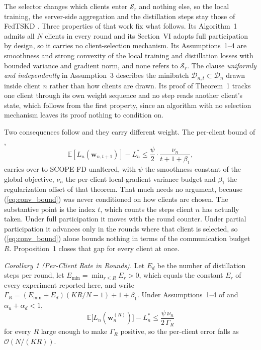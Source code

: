 \documentclass[journal]{IEEEtran}
\newcommand{\rev}[1]{#1}
\begin{document}
\rev{The selector changes which clients enter $\mathcal{S}_r$ and nothing else, so the local training, the server-side aggregation and the distillation steps stay those of FedTSKD \cite{mu2024fedtskd}. Three properties of that work fix what follows. Its Algorithm~1 admits all $N$ clients in every round and its Section~VI adopts full participation by design, so it carries no client-selection mechanism. Its Assumptions~1--4 are smoothness and strong convexity of the local training and distillation losses with bounded variance and gradient norm, and none refers to $\mathcal{S}_r$. The clause \emph{uniformly and independently} in Assumption~3 describes the minibatch $\mathcal{D}_{n,t} \subset \mathcal{D}_n$ drawn inside client $n$ rather than how clients are drawn. Its proof of Theorem~1 tracks one client through its own weight sequence and no step reads another client's state, which follows from the first property, since an algorithm with no selection mechanism leaves its proof nothing to condition on.}

\rev{Two consequences follow and they carry different weight. The per-client bound of \cite[Theorem~1]{mu2024fedtskd},}
\begin{equation}
\mathbb{E}\!\left[L_n\!\left(\bm{w}_{n,t+1}\right)\right] - L_n^{*} \le \frac{\psi}{2}\cdot\frac{\nu_n}{t+1+\beta_1},
\label{eq:conv_bound}
\end{equation}
\rev{carries over to SCOPE-FD unaltered, with $\psi$ the smoothness constant of the global objective, $\nu_n$ the per-client local-gradient variance budget and $\beta_1$ the regularization offset of that theorem. That much needs no argument, because (\ref{eq:conv_bound}) was never conditioned on how clients are chosen. The substantive point is the index $t$, which counts the steps client $n$ has actually taken. Under full participation it moves with the round counter. Under partial participation it advances only in the rounds where that client is selected, so (\ref{eq:conv_bound}) alone bounds nothing in terms of the communication budget $R$. Proposition~1 closes that gap for every client at once.}

\rev{\textit{Corollary 1 (Per-Client Rate in Rounds).} Let $E_d$ be the number of distillation steps per round, let $E_{\min} = \min_{r \le R} E_r > 0$, which equals the constant $E_r$ of every experiment reported here, and write $\Gamma_R = (E_{\min}+E_d)\left(KR/N - 1\right) + 1 + \beta_1$. Under Assumptions~1--4 of \cite{mu2024fedtskd} and $\alpha_u + \alpha_d < 1$,}
\begin{equation}
\mathbb{E}\bigl[L_n(\bm{w}_n^{(R)})\bigr] - L_n^{*} \le \frac{\psi\, \nu_n}{2\,\Gamma_R}
\label{eq:cor_perclient}
\end{equation}
\rev{for every $R$ large enough to make $\Gamma_R$ positive, so the per-client error falls as $\mathcal{O}(N/(KR))$.}
\end{document}
